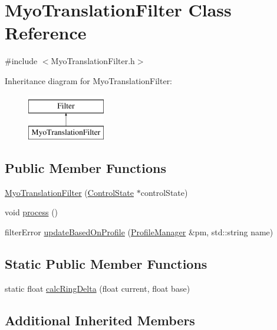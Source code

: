 \hypertarget{class_myo_translation_filter}{\section{Myo\+Translation\+Filter Class Reference}
\label{class_myo_translation_filter}
}


{\ttfamily \#include $<$Myo\+Translation\+Filter.\+h$>$}

Inheritance diagram for Myo\+Translation\+Filter\+:\begin{figure}[H]
\begin{center}
\leavevmode
\includegraphics[height=2.000000cm]{class_myo_translation_filter}
\end{center}
\end{figure}
\subsection*{Public Member Functions}
\begin{DoxyCompactItemize}
\item 
\hyperlink{class_myo_translation_filter_aacbdcc20b57a927b758770e82111ce12}{Myo\+Translation\+Filter} (\hyperlink{class_control_state}{Control\+State} $\ast$control\+State)
\item 
void \hyperlink{class_myo_translation_filter_a9f72c6ac36ed5ea26574db4b207a0597}{process} ()
\item 
filter\+Error \hyperlink{class_myo_translation_filter_a1e1d3d6a3f1bf0d82d17367fc20d704d}{update\+Based\+On\+Profile} (\hyperlink{class_profile_manager}{Profile\+Manager} \&pm, std\+::string name)
\end{DoxyCompactItemize}
\subsection*{Static Public Member Functions}
\begin{DoxyCompactItemize}
\item 
static float \hyperlink{class_myo_translation_filter_a99537f31b135a0378f8b8c335c51941c}{calc\+Ring\+Delta} (float current, float base)
\end{DoxyCompactItemize}
\subsection*{Additional Inherited Members}


